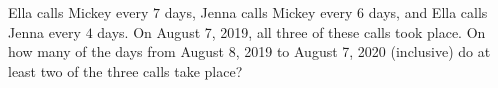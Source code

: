 Ella calls Mickey every $7$ days, Jenna calls Mickey every $6$ days, and Ella calls Jenna every $4$ days. On August 7, 2019, all three of these calls took place. On how many of the days from August 8, 2019 to August 7, 2020 (inclusive) do at least two of the three calls take place?

